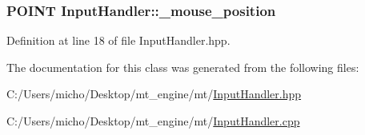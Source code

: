 \subsubsection[{\texorpdfstring{\+\_\+mouse\+\_\+position}{_mouse_position}}]{\setlength{\rightskip}{0pt plus 5cm}P\+O\+I\+NT Input\+Handler\+::\+\_\+mouse\+\_\+position\hspace{0.3cm}{\ttfamily [protected]}}\hypertarget{class_input_handler_a858d2c38bb0b24239c6fbc6be3516073_a858d2c38bb0b24239c6fbc6be3516073}{}\label{class_input_handler_a858d2c38bb0b24239c6fbc6be3516073_a858d2c38bb0b24239c6fbc6be3516073}


Definition at line 18 of file Input\+Handler.\+hpp.



The documentation for this class was generated from the following files\+:\begin{DoxyCompactItemize}
\item 
C\+:/\+Users/micho/\+Desktop/mt\+\_\+engine/mt/\hyperlink{_input_handler_8hpp}{Input\+Handler.\+hpp}\item 
C\+:/\+Users/micho/\+Desktop/mt\+\_\+engine/mt/\hyperlink{_input_handler_8cpp}{Input\+Handler.\+cpp}\end{DoxyCompactItemize}
